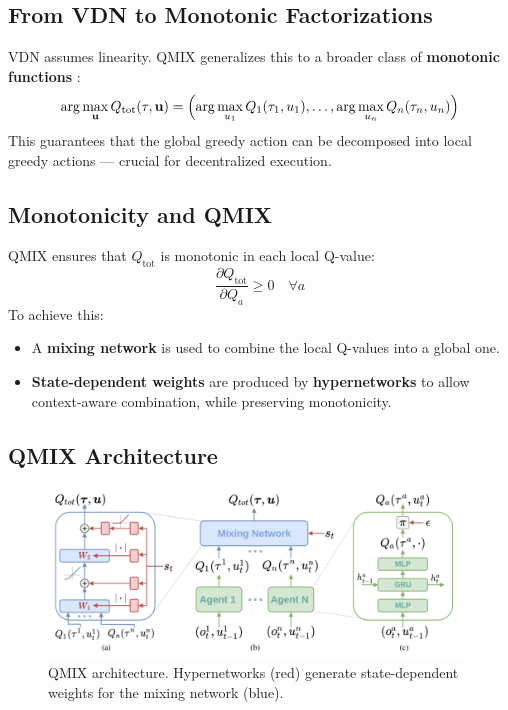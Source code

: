 \documentclass[../Main.tex]{subfiles}
\begin{document}
\subsection{From VDN to Monotonic Factorizations}

VDN assumes linearity. QMIX generalizes this to a broader class of \textbf{monotonic functions} \cite{rashid2018qmix}:
\[
\arg\max_{\mathbf{u}} Q_{\text{tot}}(\tau, \mathbf{u}) = 
\Bigl(
\arg\max_{u_1} Q_1(\tau_1, u_1), \dots,
\arg\max_{u_n} Q_n(\tau_n, u_n)
\Bigr)
\]
This guarantees that the global greedy action can be decomposed into local greedy actions — crucial for decentralized execution.

\subsection{Monotonicity and QMIX}

QMIX ensures that \( Q_{\text{tot}} \) is monotonic in each local Q-value:
\[
\frac{\partial Q_{\text{tot}}}{\partial Q_a} \geq 0 \quad \forall a
\]
To achieve this:
\begin{itemize}
    \item A \textbf{mixing network} is used to combine the local Q-values into a global one.
    \item \textbf{State-dependent weights} are produced by \textbf{hypernetworks} to allow context-aware combination, while preserving monotonicity.
\end{itemize}

\subsection{QMIX Architecture}
\begin{figure}[h]
    \centering
    \includegraphics[width=\linewidth]{img/qmix.png}
    \caption{QMIX architecture. Hypernetworks (red) generate state-dependent weights for the mixing network (blue).}
\end{figure}
\end{document}

